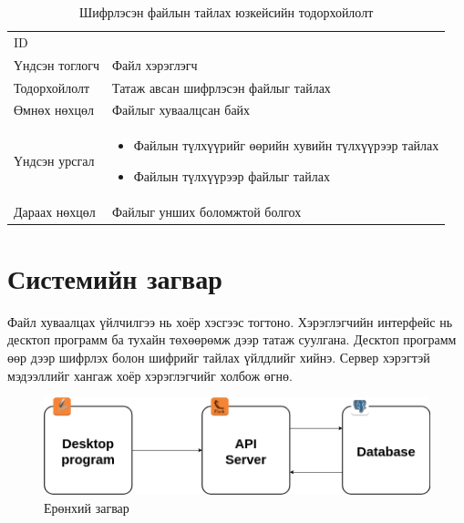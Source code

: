 \begin{table}[H]
    \footnotesize
    \centering
    \begin{tabularx}{\textwidth}{|>{\hsize=0.3\hsize}X|>{\hsize=0.7\hsize}X|}
        \hline
        \multicolumn{2}{|c|}{Шифрлэсэн файлын тайлах}        \\
        \hline
        ID             & 7                                   \\
        \hline
        Үндсэн тоглогч & Файл хэрэглэгч                      \\
        \hline
        Тодорхойлолт   & Татаж авсан шифрлэсэн файлыг тайлах \\
        \hline
        Өмнөх нөхцөл   & Файлыг хуваалцсан байх              \\
        \hline
        Үндсэн урсгал  &
        \begin{minipage}{\linewidth}
            \begin{itemize}
                \item Файлын түлхүүрийг өөрийн хувийн түлхүүрээр тайлах
                \item Файлын түлхүүрээр файлыг тайлах
            \end{itemize}
        \end{minipage}
        \\
        \hline
        Дараах нөхцөл  & Файлыг унших боломжтой болгох       \\
        \hline
    \end{tabularx}
    \caption{Шифрлэсэн файлын тайлах юзкейсийн тодорхойлолт}
\end{table}

\section{Системийн загвар}
Файл хуваалцах үйлчилгээ нь хоёр хэсгээс тогтоно. Хэрэглэгчийн интерфейс нь десктоп программ ба тухайн төхөөрөмж дээр татаж суулгана.
Десктоп программ өөр дээр шифрлэх болон шифрийг тайлах үйлдлийг хийнэ. Сервер хэрэгтэй мэдээллийг хангаж хоёр хэрэглэгчийг холбож өгнө.
\begin{figure}[ht]
    \centering
    \includegraphics[scale=0.4]{Figures/main_diagram.drawio.png}
    \caption[Usecase diagram]{Ерөнхий загвар}
    \label{fig:main_scheme}
\end{figure}


